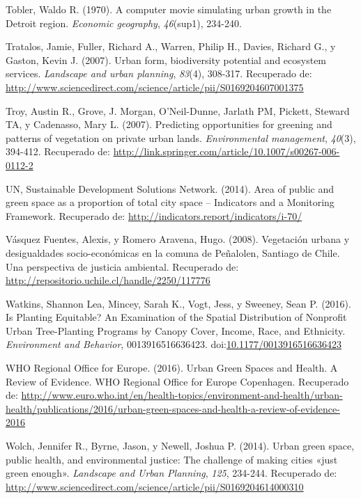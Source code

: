 \documentclass[12pt,a4paper,openany]{book}
\theoremstyle{definition}
\theoremstyle{definition}
\theoremstyle{definition}
\theoremstyle{remark}
\begin{document}
\hypertarget{ref-tobler1970computer}{}
Tobler, Waldo R. (1970). A computer movie simulating urban growth in the
Detroit region. \emph{Economic geography}, \emph{46}(sup1), 234-240.

\hypertarget{ref-tratalos_urban_2007}{}
Tratalos, Jamie, Fuller, Richard A., Warren, Philip H., Davies, Richard
G., y Gaston, Kevin J. (2007). Urban form, biodiversity potential and
ecosystem services. \emph{Landscape and urban planning}, \emph{83}(4),
308-317. Recuperado de:
\url{http://www.sciencedirect.com/science/article/pii/S0169204607001375}

\hypertarget{ref-troy_predicting_2007}{}
Troy, Austin R., Grove, J. Morgan, O'Neil-Dunne, Jarlath PM, Pickett,
Steward TA, y Cadenasso, Mary L. (2007). Predicting opportunities for
greening and patterns of vegetation on private urban lands.
\emph{Environmental management}, \emph{40}(3), 394-412. Recuperado de:
\url{http://link.springer.com/article/10.1007/s00267-006-0112-2}

\hypertarget{ref-un2014sdg}{}
UN, Sustainable Development Solutions Network. (2014). Area of public
and green space as a proportion of total city space -- Indicators and a
Monitoring Framework. Recuperado de:
\url{http://indicators.report/indicators/i-70/}

\hypertarget{ref-vasquez_fuentes_vegetacion_2008}{}
Vásquez Fuentes, Alexis, y Romero Aravena, Hugo. (2008). Vegetación
urbana y desigualdades socio-económicas en la comuna de Peñalolen,
Santiago de Chile. Una perspectiva de justicia ambiental. Recuperado de:
\url{http://repositorio.uchile.cl/handle/2250/117776}

\hypertarget{ref-watkins_is_2016}{}
Watkins, Shannon Lea, Mincey, Sarah K., Vogt, Jess, y Sweeney, Sean P.
(2016). Is Planting Equitable? An Examination of the Spatial
Distribution of Nonprofit Urban Tree-Planting Programs by Canopy Cover,
Income, Race, and Ethnicity. \emph{Environment and Behavior},
0013916516636423.
doi:\href{https://doi.org/10.1177/0013916516636423}{10.1177/0013916516636423}

\hypertarget{ref-who2016urban}{}
WHO Regional Office for Europe. (2016). Urban Green Spaces and Health. A
Review of Evidence. WHO Regional Office for Europe Copenhagen.
Recuperado de:
\url{http://www.euro.who.int/en/health-topics/environment-and-health/urban-health/publications/2016/urban-green-spaces-and-health-a-review-of-evidence-2016}

\hypertarget{ref-wolch_urban_2014}{}
Wolch, Jennifer R., Byrne, Jason, y Newell, Joshua P. (2014). Urban
green space, public health, and environmental justice: The challenge of
making cities «just green enough». \emph{Landscape and Urban Planning},
\emph{125}, 234-244. Recuperado de:
\url{http://www.sciencedirect.com/science/article/pii/S0169204614000310}
\end{document}
